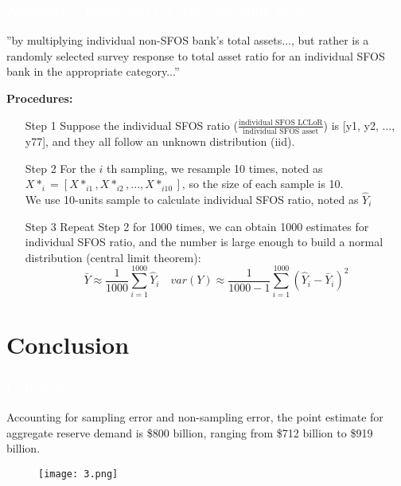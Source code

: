 \documentclass{beamer}	%
\theoremstyle{plain}
\theoremstyle{definition}
\theoremstyle{remark}
\numberwithin{equation}{section}
\begin{document}
\begin{frame}
\frametitle{\textcolor{white}{Approach \uppercase\expandafter{} : Bootstrap for Non-Sampling Error}}
\scriptsize
''by multiplying individual non-SFOS bank's total assets..., but rather is a randomly selected survey response to total asset ratio for an individual SFOS bank in the appropriate category...''\\
\vbox{}

\small \textbf{Procedures:}
\begin{itemize}
\scriptsize
\item[Step 1] 
Suppose the individual SFOS ratio ($\frac{\text{individual SFOS LCLoR}}{\text{individual SFOS asset}}$) is [y1, y2, ..., y77], and they all follow an unknown distribution (iid). 

\item[Step 2]
For the $i$ th sampling, we resample 10 times, noted as $X*_{i} = [X*_{i 1}, X*_{i 2}, ...,X*_{i 10}]$, so the size of each sample is 10. \\
We use 10-units sample to calculate individual SFOS ratio, noted as $\hat{Y}_{i}$

\item[Step 3]
Repeat Step 2 for 1000 times, we can obtain 1000 estimates for individual SFOS ratio, and the number is large enough to build a normal distribution (central limit theorem):
\begin{equation}
\bar{Y} \approx \frac{1}{1000} \sum_{i=1}^{1000} \hat{Y}_{i} \quad var(Y) \approx \frac{1}{1000-1} \sum_{i=1}^{1000} (\hat{Y}_{i}-\bar{Y}_{i})^{2}
\end{equation}

\end{itemize}
\end{frame}


\section{Conclusion}
\begin{frame}
\frametitle{\textcolor{white}{Conclusions}}
\small
Accounting for sampling error and non-sampling error, the point estimate for aggregate reserve demand is \$800 billion, ranging from \$712 billion to \$919 billion.

\begin{figure}[htbp] 
\centering
\texttt{[image: 3.png]} 
\end{figure} 

\end{frame}
\end{document}
